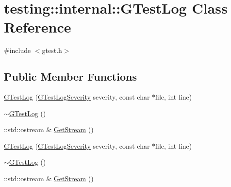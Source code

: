 \hypertarget{classtesting_1_1internal_1_1_g_test_log}{\section{testing\-:\-:internal\-:\-:G\-Test\-Log Class Reference}
\label{classtesting_1_1internal_1_1_g_test_log}
}


{\ttfamily \#include $<$gtest.\-h$>$}

\subsection*{Public Member Functions}
\begin{DoxyCompactItemize}
\item 
\hyperlink{classtesting_1_1internal_1_1_g_test_log_a364691bf972983a59cfa2891062a64af}{G\-Test\-Log} (\hyperlink{namespacetesting_1_1internal_aa6255ef3b023c5b4e1a2198d887fb977}{G\-Test\-Log\-Severity} severity, const char $\ast$file, int line)
\item 
\hyperlink{classtesting_1_1internal_1_1_g_test_log_a978a099703bbaa0f380216e8d7ee03d3}{$\sim$\-G\-Test\-Log} ()
\item 
\-::std\-::ostream \& \hyperlink{classtesting_1_1internal_1_1_g_test_log_aebb92e67d98eca69f0347d5121dab27a}{Get\-Stream} ()
\item 
\hyperlink{classtesting_1_1internal_1_1_g_test_log_a364691bf972983a59cfa2891062a64af}{G\-Test\-Log} (\hyperlink{namespacetesting_1_1internal_aa6255ef3b023c5b4e1a2198d887fb977}{G\-Test\-Log\-Severity} severity, const char $\ast$file, int line)
\item 
\hyperlink{classtesting_1_1internal_1_1_g_test_log_a978a099703bbaa0f380216e8d7ee03d3}{$\sim$\-G\-Test\-Log} ()
\item 
\-::std\-::ostream \& \hyperlink{classtesting_1_1internal_1_1_g_test_log_aebb92e67d98eca69f0347d5121dab27a}{Get\-Stream} ()
\end{DoxyCompactItemize}



